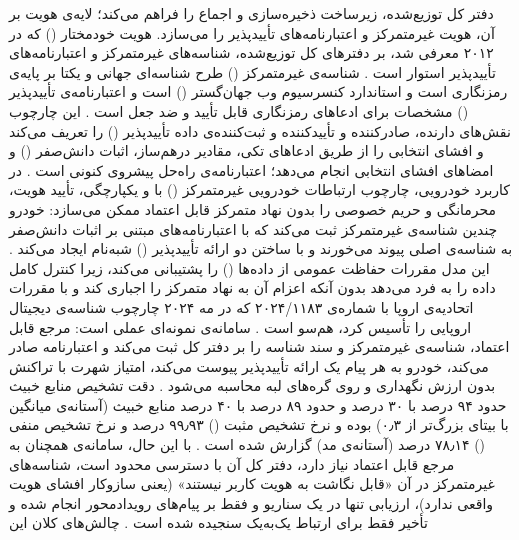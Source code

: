 دفتر کل توزیع‌شده، زیرساخت ذخیره‌سازی و اجماع را فراهم می‌کند؛ لایه‌ی هویت بر آن، هویت غیرمتمرکز و اعتبارنامه‌های تأییدپذیر را می‌سازد. هویت خودمختار () که در ۲۰۱۲ معرفی شد، بر دفترهای کل توزیع‌شده، شناسه‌های غیرمتمرکز و اعتبارنامه‌های تأییدپذیر استوار است \cite{mazzocca2025survey}. شناسه‌ی غیرمتمرکز () طرح شناسه‌ای جهانی و یکتا بر پایه‌ی رمزنگاری است و استاندارد کنسرسیوم وب جهان‌گستر () است \cite{mazzocca2025survey} و اعتبارنامه‌ی تأییدپذیر () مشخصات  برای ادعاهای رمزنگاری قابل تأیید و ضد جعل است \cite{mazzocca2025survey}. این چارچوب نقش‌های دارنده، صادرکننده و تأییدکننده و ثبت‌کننده‌ی داده تأییدپذیر () را تعریف می‌کند \cite{mazzocca2025survey} و افشای انتخابی را از طریق ادعاهای تکی، مقادیر درهم‌ساز، اثبات دانش‌صفر () و امضاهای افشای انتخابی انجام می‌دهد؛ اعتبارنامه‌ی  راه‌حل پیشروی کنونی است \cite{mazzocca2025survey}. در کاربرد خودرویی، چارچوب ارتباطات خودرویی غیرمتمرکز () با  و  یکپارچگی، تأیید هویت، محرمانگی و حریم خصوصی را بدون نهاد متمرکز قابل اعتماد ممکن می‌سازد: خودرو چندین شناسه‌ی غیرمتمرکز ثبت می‌کند که با اعتبارنامه‌های مبتنی بر اثبات دانش‌صفر به شناسه‌ی اصلی پیوند می‌خورند و با ساختن دو ارائه تأییدپذیر () شبه‌نام ایجاد می‌کند \cite{mazzocca2025survey}. این مدل مقررات حفاظت عمومی از داده‌ها () را پشتیبانی می‌کند، زیرا کنترل کامل داده را به فرد می‌دهد بدون آنکه اعزام آن به نهاد متمرکز را اجباری کند \cite{mazzocca2025survey} و با مقررات اتحادیه‌ی اروپا با شماره‌ی ۲۰۲۴/۱۱۸۳ که در مه ۲۰۲۴ چارچوب شناسه‌ی دیجیتال اروپایی را تأسیس کرد، هم‌سو است \cite{mazzocca2025survey}. سامانه‌ی  نمونه‌ای عملی است: مرجع قابل اعتماد، شناسه‌ی غیرمتمرکز و سند شناسه را بر دفتر کل ثبت می‌کند و اعتبارنامه صادر می‌کند، خودرو به هر پیام یک ارائه تأییدپذیر پیوست می‌کند، امتیاز شهرت با تراکنش بدون ارزش نگهداری و روی گره‌های لبه محاسبه می‌شود \cite{feraudoDIVADIDbasedReputation2024}. دقت تشخیص منابع خبیث حدود ۹۴ درصد با ۳۰ درصد و حدود ۸۹ درصد با ۴۰ درصد منابع خبیث (آستانه‌ی میانگین با بیتای بزرگ‌تر از ۰٫۳) بوده و نرخ تشخیص مثبت () ۹۹٫۹۳ درصد و نرخ تشخیص منفی () ۷۸٫۱۴ درصد (آستانه‌ی مد) گزارش شده است \cite{feraudoDIVADIDbasedReputation2024}. با این حال، سامانه‌ی  همچنان به مرجع قابل اعتماد نیاز دارد، دفتر کل آن با دسترسی محدود است، شناسه‌های غیرمتمرکز در آن «قابل نگاشت به هویت کاربر نیستند» (یعنی سازوکار افشای هویت واقعی ندارد)، ارزیابی تنها در یک سناریو و فقط بر پیام‌های رویدادمحور انجام شده و تأخیر فقط برای ارتباط یک‌به‌یک سنجیده شده است \cite{feraudoDIVADIDbasedReputation2024}. چالش‌های کلان این 